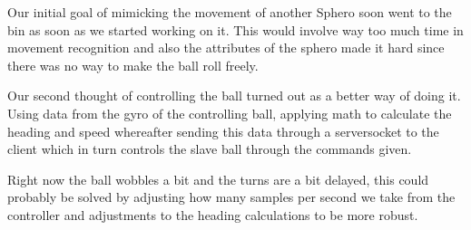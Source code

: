 
Our initial goal of mimicking the movement of another Sphero soon went to the bin as soon as we started working on it. This would involve way too much time in movement recognition and also the attributes of the sphero made it hard since there was no way to make the ball roll freely.

Our second thought of controlling the ball turned out as a better way of doing it. Using data from the gyro of the controlling ball, applying math to calculate the heading and speed whereafter sending this data through a serversocket to the client which in turn controls the slave ball through the commands given.

Right now the ball wobbles a bit and the turns are a bit delayed, this could probably be solved by adjusting how many samples per second we take from the controller and adjustments to the heading calculations to be more robust.

